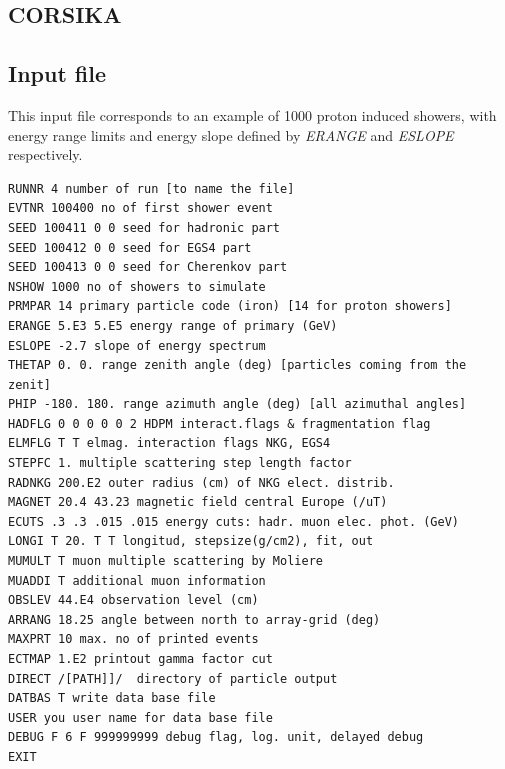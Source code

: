 \documentclass{article}
\begin{document}
\newpage





\newpage
\begin{appendices}

\section{CORSIKA} 
\subsection{Input file}
\label{filecorsika}
This input file corresponds to an example of 1000 proton induced showers, with energy range limits and energy slope defined by \emph{ERANGE} and \emph{ESLOPE} respectively.
\begin{lstlisting}[basicstyle=\tiny]
RUNNR 4 number of run [to name the file]
EVTNR 100400 no of first shower event 
SEED 100411 0 0 seed for hadronic part
SEED 100412 0 0 seed for EGS4 part
SEED 100413 0 0 seed for Cherenkov part
NSHOW 1000 no of showers to simulate
PRMPAR 14 primary particle code (iron) [14 for proton showers]
ERANGE 5.E3 5.E5 energy range of primary (GeV) 
ESLOPE -2.7 slope of energy spectrum
THETAP 0. 0. range zenith angle (deg) [particles coming from the zenit]
PHIP -180. 180. range azimuth angle (deg) [all azimuthal angles]
HADFLG 0 0 0 0 0 2 HDPM interact.flags & fragmentation flag
ELMFLG T T elmag. interaction flags NKG, EGS4
STEPFC 1. multiple scattering step length factor
RADNKG 200.E2 outer radius (cm) of NKG elect. distrib.
MAGNET 20.4 43.23 magnetic field central Europe (/uT)
ECUTS .3 .3 .015 .015 energy cuts: hadr. muon elec. phot. (GeV)
LONGI T 20. T T longitud, stepsize(g/cm2), fit, out
MUMULT T muon multiple scattering by Moliere
MUADDI T additional muon information
OBSLEV 44.E4 observation level (cm)
ARRANG 18.25 angle between north to array-grid (deg)
MAXPRT 10 max. no of printed events
ECTMAP 1.E2 printout gamma factor cut
DIRECT /[PATH]]/  directory of particle output
DATBAS T write data base file
USER you user name for data base file
DEBUG F 6 F 999999999 debug flag, log. unit, delayed debug
EXIT
\end{lstlisting}


\end{appendices}
\end{document}

